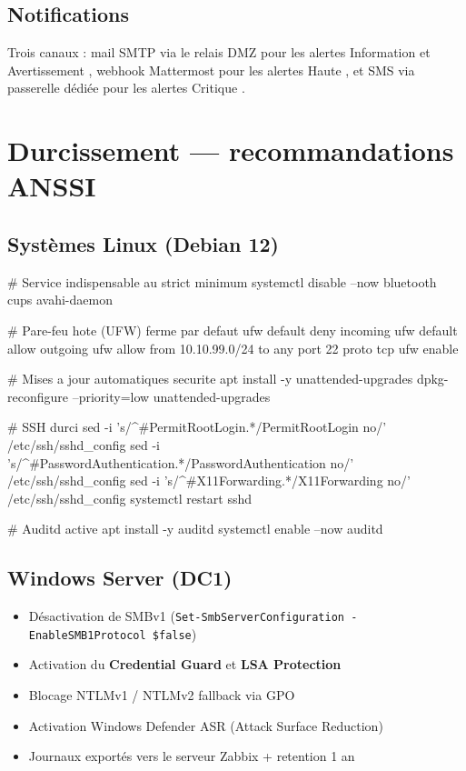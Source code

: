 \documentclass[11pt,a4paper]{article}
\begin{document}
\subsection{Notifications}

Trois canaux : mail SMTP via le relais DMZ pour les alertes \og Information \fg{} et \og Avertissement \fg{}, webhook Mattermost pour les alertes \og Haute \fg{}, et SMS via passerelle dédiée pour les alertes \og Critique \fg{}.

\section{Durcissement — recommandations ANSSI}

\subsection{Systèmes Linux (Debian 12)}

\begin{cfgbox}[listing options={style=cfg,language=bash}]
# Service indispensable au strict minimum
systemctl disable --now bluetooth cups avahi-daemon

# Pare-feu hote (UFW) ferme par defaut
ufw default deny incoming
ufw default allow outgoing
ufw allow from 10.10.99.0/24 to any port 22 proto tcp
ufw enable

# Mises a jour automatiques securite
apt install -y unattended-upgrades
dpkg-reconfigure --priority=low unattended-upgrades

# SSH durci
sed -i 's/^#\?PermitRootLogin.*/PermitRootLogin no/' /etc/ssh/sshd_config
sed -i 's/^#\?PasswordAuthentication.*/PasswordAuthentication no/' /etc/ssh/sshd_config
sed -i 's/^#\?X11Forwarding.*/X11Forwarding no/' /etc/ssh/sshd_config
systemctl restart sshd

# Auditd active
apt install -y auditd
systemctl enable --now auditd
\end{cfgbox}

\subsection{Windows Server (DC1)}

\begin{itemize}
  \item Désactivation de SMBv1 (\texttt{Set-SmbServerConfiguration -EnableSMB1Protocol \$false})
  \item Activation du \textbf{Credential Guard} et \textbf{LSA Protection}
  \item Blocage NTLMv1 / NTLMv2 fallback via GPO
  \item Activation Windows Defender ASR (Attack Surface Reduction)
  \item Journaux exportés vers le serveur Zabbix + retention 1 an
\end{itemize}
\end{document}
